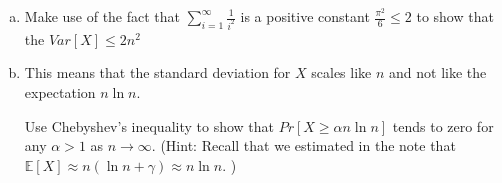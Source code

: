 \documentclass[11pt]{article}
\newif\ifsolutions
\begin{document}
\begin{enumerate}
\begin{enumerate}[a)]
\item Make use of the fact that $\sum\nolimits_{i=1}^{\infty}
  \frac{1}{i^2}$ is a positive constant $\frac{\pi^2}{6} \leq 2$ to show that the $Var[X] \leq 2n^2$ 

\ifsolutions{\color{blue}{
We use the fact that the $X_i$'s are independent, 
\begin{align*}
Var[X] &= \sum\nolimits_{i=1}^{n} Var[X_i] \\ 
&\leq \sum\nolimits_{i=1}^{n} \left(\frac{n}{n-i+1}\right)^2 \\
&= n^2\sum\nolimits_{j=1}^{n} \frac{1}{j^2} \\
&\leq n^2\sum\nolimits_{j=1}^{\infty} \frac{1}{j^2} \\
&\leq 2n^2
\end{align*}
}}\fi

\item This means that the standard deviation for $X$ scales like $n$
  and not like the expectation $n \ln n$. 

 Use Chebyshev's inequality to show that $Pr[ X \geq \alpha n
  \ln{n}]$ tends to zero for any $\alpha > 1$ as $n \rightarrow
  \infty$. (Hint: Recall that we estimated in the note that
  $\mathbb{E}[X] \approx n(\ln{n} + \gamma) \approx n \ln{n}$. ) 

\ifsolutions{\color{blue}{ 


\begin{align*}
Pr[ X \geq \alpha n\ln{n}] &\approx Pr[ X \geq (\alpha-1)n\ln{n} + \mathbb{E}[X]] \\ 
&=  Pr[ X - \mathbb{E}[X] \geq (\alpha - 1)n\ln{n} ] \\
&\leq Pr[ | X - \mathbb{E}[X] | \geq (\alpha-1)n\ln{n} ] \\
&\leq \frac{Var[X]}{((\alpha-1)n\ln{n})^2} \\
&\leq \frac{2n^2}{((\alpha-1)^2n^2(\ln{n})^2} \\
&= \frac{2}{(\alpha-1)^2(\ln{n})^2} \\
& \lim_{n \to \infty} \frac{2}{(\alpha-1)^2(\ln{n})^2}  = 0 \\
\end{align*}
}}\fi


\end{enumerate}


\end{enumerate}
\end{document}
